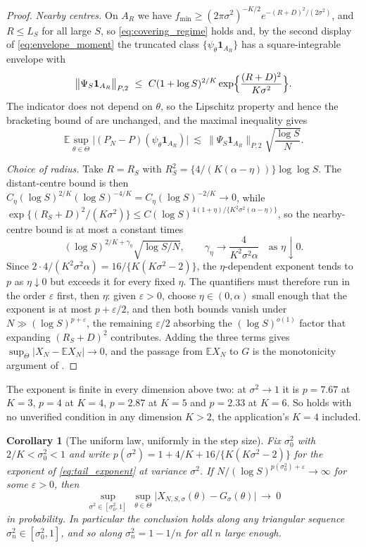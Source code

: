 \documentclass[11pt]{article}
\newtheorem{corollary}[corollary]{Corollary}
\theoremstyle{definition}
\newcommand{\E}{\mathbb{E}}
\begin{document}
\begin{proof}
\emph{Nearby centres.} On $A_R$ we have $f_{\min}\ge(2\pi\sigma^2)^{-K/2}e^{-(R+D)^2/(2\sigma^2)}$, and $R\le L_S$ for all large $S$, so \eqref{eq:covering_regime} holds and, by the second display of \eqref{eq:envelope_moment} the truncated class $\{\psi_\theta\mathbf{1}_{A_R}\}$ has a square-integrable envelope with
\[
\bigl\lVert\Psi_S\mathbf{1}_{A_R}\bigr\rVert_{P,2}
\ \le\ C(1+\log S)^{2/K}\exp\Bigl\{\frac{(R+D)^2}{K\sigma^2}\Bigr\}.
\]
The indicator does not depend on $\theta$, so the Lipschitz property and hence the bracketing bound of  are unchanged, and the maximal inequality gives
\[
\E\sup_{\theta\in\Theta}\bigl\lvert(P_N-P)(\psi_\theta\mathbf{1}_{A_R})\bigr\rvert
\ \lesssim\ \bigl\lVert\Psi_S\mathbf{1}_{A_R}\bigr\rVert_{P,2}\sqrt{\frac{\log S}{N}} .
\]

\emph{Choice of radius.} Take $R=R_S$ with $R_S^2=\{4/(K(\alpha-\eta))\}\log\log S$. The distant-centre bound is then $C_\eta(\log S)^{2/K}(\log S)^{-4/K}=C_\eta(\log S)^{-2/K}\to0$, while $\exp\{(R_S+D)^2/(K\sigma^2)\}\le C(\log S)^{4(1+\eta)/\{K^2\sigma^2(\alpha-\eta)\}}$, so the nearby-centre bound is at most a constant times
\[
(\log S)^{2/K+\gamma_\eta}\sqrt{\log S/N},
\qquad
\gamma_\eta\longrightarrow\frac4{K^2\sigma^2\alpha}
\quad\text{as }\eta\downarrow0 .
\]
 Since $2\cdot4/(K^2\sigma^2\alpha)=16/\{K(K\sigma^2-2)\}$, the $\eta$-dependent exponent tends to $p$ as $\eta\downarrow0$ but exceeds it for every fixed $\eta$. The quantifiers must therefore run in the order $\varepsilon$ first, then $\eta$: given $\varepsilon>0$, choose $\eta\in(0,\alpha)$ small enough that the exponent is at most $p+\varepsilon/2$, and then both bounds vanish under $N\gg(\log S)^{p+\varepsilon}$, the remaining $\varepsilon/2$ absorbing the $(\log S)^{o(1)}$ factor that expanding $(R_S+D)^2$ contributes. Adding the three terms gives $\sup_\Theta\lvert X_N-\E X_N\rvert\to0$, and the passage from $\E X_N$ to $G$ is the monotonicity argument of .
\end{proof}

The exponent is finite in every dimension above two: at $\sigma^2\to1$ it is $p=7.67$ at $K=3$, $p=4$ at $K=4$, $p=2.87$ at $K=5$ and $p=2.33$ at $K=6$. So  holds with no unverified condition in any dimension $K>2$, the application's $K=4$ included.

\begin{corollary}[The uniform law, uniformly in the step size]\label{cor:uniform_lln_sigma}
Fix $\sigma_0^2$ with $2/K<\sigma_0^2<1$ and write $p(\sigma^2)=1+4/K+16/\{K(K\sigma^2-2)\}$ for the exponent of \eqref{eq:tail_exponent} at variance $\sigma^2$. If $N/(\log S)^{p(\sigma_0^2)+\varepsilon}\to\infty$ for some $\varepsilon>0$, then
\[
\sup_{\sigma^2\in[\sigma_0^2,1]}\ \sup_{\theta\in\Theta}\bigl\lvert X_{N,S,\sigma}(\theta)-G_\sigma(\theta)\bigr\rvert\ \longrightarrow\ 0
\]
in probability. In particular the conclusion holds along any triangular sequence $\sigma_n^2\in[\sigma_0^2,1]$, and so along $\sigma_n^2=1-1/n$ for all $n$ large enough.
\end{corollary}
\end{document}
